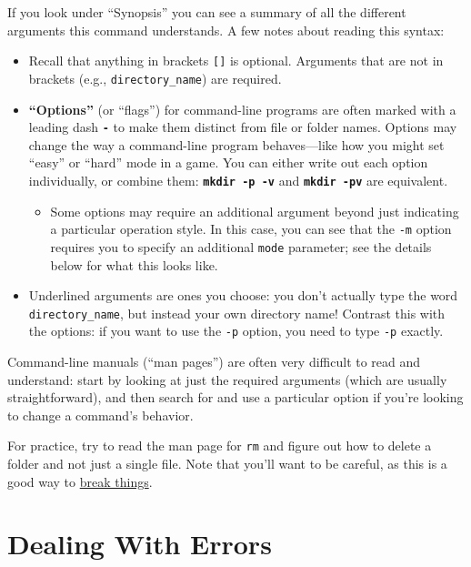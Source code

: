 \documentclass[]{book}
\providecommand{\tightlist}{%
  \setlength{\itemsep}{0pt}\setlength{\parskip}{0pt}}
\theoremstyle{definition}
\theoremstyle{definition}
\theoremstyle{remark}
\begin{document}
If you look under ``Synopsis'' you can see a summary of all the
different arguments this command understands. A few notes about reading
this syntax:

\begin{itemize}
\item
  Recall that anything in brackets \texttt{{[}{]}} is optional.
  Arguments that are not in brackets (e.g., \texttt{directory\_name})
  are required.
\item
  \textbf{``Options''} (or ``flags'') for command-line programs are
  often marked with a leading dash \textbf{\texttt{-}} to make them
  distinct from file or folder names. Options may change the way a
  command-line program behaves---like how you might set ``easy'' or
  ``hard'' mode in a game. You can either write out each option
  individually, or combine them: \textbf{\texttt{mkdir\ -p\ -v}} and
  \textbf{\texttt{mkdir\ -pv}} are equivalent.

  \begin{itemize}
  \tightlist
  \item
    Some options may require an additional argument beyond just
    indicating a particular operation style. In this case, you can see
    that the \texttt{-m} option requires you to specify an additional
    \texttt{mode} parameter; see the details below for what this looks
    like.
  \end{itemize}
\item
  Underlined arguments are ones you choose: you don't actually type the
  word \texttt{directory\_name}, but instead your own directory name!
  Contrast this with the options: if you want to use the \texttt{-p}
  option, you need to type \texttt{-p} exactly.
\end{itemize}

Command-line manuals (``man pages'') are often very difficult to read
and understand: start by looking at just the required arguments (which
are usually straightforward), and then search for and use a particular
option if you're looking to change a command's behavior.

For practice, try to read the man page for \texttt{rm} and figure out
how to delete a folder and not just a single file. Note that you'll want
to be careful, as this is a good way to
\href{http://www.pcworld.com/article/3057235/data-center-cloud/that-man-who-deleted-his-entire-company-with-a-line-of-code-it-was-a-hoax.html}{break
things}.

\section{Dealing With Errors}\label{dealing-with-errors}
\end{document}
